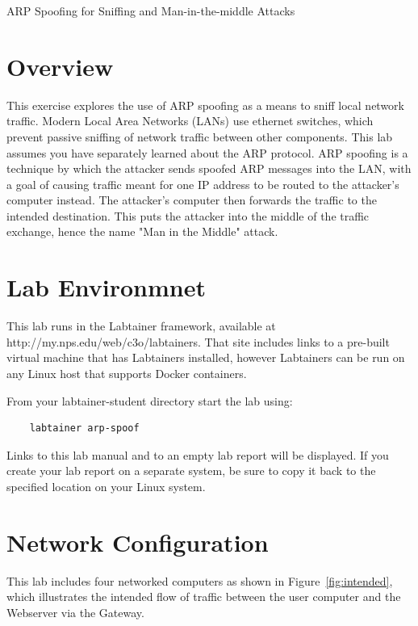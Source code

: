


\begin{center}
{\LARGE ARP Spoofing for Sniffing and Man-in-the-middle Attacks}
\vspace{0.1in}\\
\end{center}

\copyrightnotice

\section{Overview}
This exercise explores the use of ARP spoofing as a means to
sniff local network traffic.  Modern Local Area Networks (LANs)
use ethernet switches, which prevent passive sniffing of network
traffic between other components.  This lab assumes you have
separately learned about the ARP protocol.  ARP spoofing is
a technique by which the attacker sends spoofed ARP messages
into the LAN, with a goal of causing traffic meant for one IP
address to be routed to the attacker's computer instead.  The
attacker's computer then forwards the traffic to the intended
destination.  This puts the attacker into the middle of the
traffic exchange, hence the name "Man in the Middle" attack.

\section{Lab Environmnet}
This lab runs in the Labtainer framework,
available at http://my.nps.edu/web/c3o/labtainers.
That site includes links to a pre-built virtual machine
that has Labtainers installed, however Labtainers can
be run on any Linux host that supports Docker containers.

From your labtainer-student directory start the lab using:
\begin{verbatim}
    labtainer arp-spoof
\end{verbatim}
Links to this lab manual and to an empty lab report will be displayed.  If you create your lab report on a separate system, 
be sure to copy it back to the specified location on your Linux system.


\section{Network Configuration}
This lab includes four networked computers as shown in Figure~\ref{fig:intended},
which illustrates the intended flow of traffic between the user computer and
the Webserver via the Gateway.  

